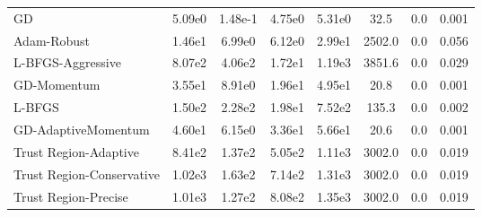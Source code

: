 \documentclass{article}
\begin{document}
\begin{table}[htbp]
{\begin{tabular}{p{2.5cm}*{7}{c}}
GD & 5.09e0 & 1.48e-1 & 4.75e0 & 5.31e0 & 32.5 & 0.0 & 0.001 \\
Adam-Robust & 1.46e1 & 6.99e0 & 6.12e0 & 2.99e1 & 2502.0 & 0.0 & 0.056 \\
L-BFGS-Aggressive & 8.07e2 & 4.06e2 & 1.72e1 & 1.19e3 & 3851.6 & 0.0 & 0.029 \\
GD-Momentum & 3.55e1 & 8.91e0 & 1.96e1 & 4.95e1 & 20.8 & 0.0 & 0.001 \\
L-BFGS & 1.50e2 & 2.28e2 & 1.98e1 & 7.52e2 & 135.3 & 0.0 & 0.002 \\
GD-AdaptiveMomentum & 4.60e1 & 6.15e0 & 3.36e1 & 5.66e1 & 20.6 & 0.0 & 0.001 \\
Trust Region-Adaptive & 8.41e2 & 1.37e2 & 5.05e2 & 1.11e3 & 3002.0 & 0.0 & 0.019 \\
Trust Region-Conservative & 1.02e3 & 1.63e2 & 7.14e2 & 1.31e3 & 3002.0 & 0.0 & 0.019 \\
Trust Region-Precise & 1.01e3 & 1.27e2 & 8.08e2 & 1.35e3 & 3002.0 & 0.0 & 0.019 \\
\bottomrule
\end{tabular}
}
\end{table}
\end{document}

